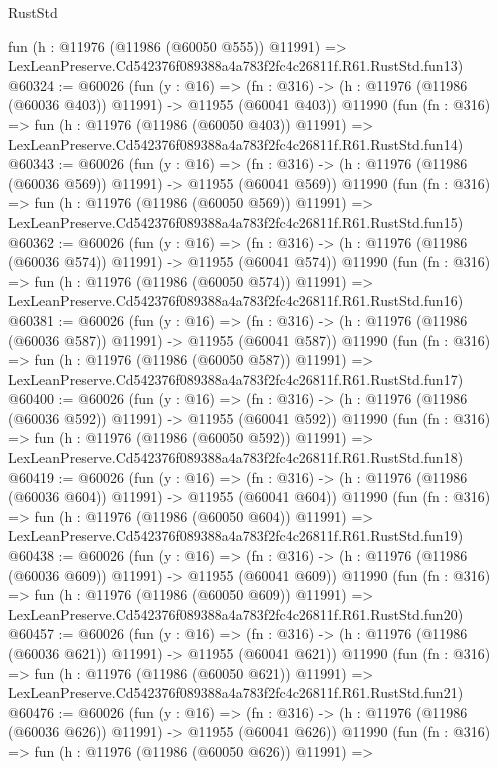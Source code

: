 \begin{lexlean}{RustStd}
\begin{coremodule}
    fun (h : @11976 (@11986 (@60050 @555)) @11991) =>
    LexLeanPreserve.Cd542376f089388a4a783f2fc4c26811f.R61.RustStd.fun13)
@60324 := @60026
    (fun (y : @16) =>
    (fn : @316) -> (h : @11976 (@11986 (@60036 @403)) @11991) -> @11955 (@60041 @403))
    @11990
    (fun (fn : @316) =>
    fun (h : @11976 (@11986 (@60050 @403)) @11991) =>
    LexLeanPreserve.Cd542376f089388a4a783f2fc4c26811f.R61.RustStd.fun14)
@60343 := @60026
    (fun (y : @16) =>
    (fn : @316) -> (h : @11976 (@11986 (@60036 @569)) @11991) -> @11955 (@60041 @569))
    @11990
    (fun (fn : @316) =>
    fun (h : @11976 (@11986 (@60050 @569)) @11991) =>
    LexLeanPreserve.Cd542376f089388a4a783f2fc4c26811f.R61.RustStd.fun15)
@60362 := @60026
    (fun (y : @16) =>
    (fn : @316) -> (h : @11976 (@11986 (@60036 @574)) @11991) -> @11955 (@60041 @574))
    @11990
    (fun (fn : @316) =>
    fun (h : @11976 (@11986 (@60050 @574)) @11991) =>
    LexLeanPreserve.Cd542376f089388a4a783f2fc4c26811f.R61.RustStd.fun16)
@60381 := @60026
    (fun (y : @16) =>
    (fn : @316) -> (h : @11976 (@11986 (@60036 @587)) @11991) -> @11955 (@60041 @587))
    @11990
    (fun (fn : @316) =>
    fun (h : @11976 (@11986 (@60050 @587)) @11991) =>
    LexLeanPreserve.Cd542376f089388a4a783f2fc4c26811f.R61.RustStd.fun17)
@60400 := @60026
    (fun (y : @16) =>
    (fn : @316) -> (h : @11976 (@11986 (@60036 @592)) @11991) -> @11955 (@60041 @592))
    @11990
    (fun (fn : @316) =>
    fun (h : @11976 (@11986 (@60050 @592)) @11991) =>
    LexLeanPreserve.Cd542376f089388a4a783f2fc4c26811f.R61.RustStd.fun18)
@60419 := @60026
    (fun (y : @16) =>
    (fn : @316) -> (h : @11976 (@11986 (@60036 @604)) @11991) -> @11955 (@60041 @604))
    @11990
    (fun (fn : @316) =>
    fun (h : @11976 (@11986 (@60050 @604)) @11991) =>
    LexLeanPreserve.Cd542376f089388a4a783f2fc4c26811f.R61.RustStd.fun19)
@60438 := @60026
    (fun (y : @16) =>
    (fn : @316) -> (h : @11976 (@11986 (@60036 @609)) @11991) -> @11955 (@60041 @609))
    @11990
    (fun (fn : @316) =>
    fun (h : @11976 (@11986 (@60050 @609)) @11991) =>
    LexLeanPreserve.Cd542376f089388a4a783f2fc4c26811f.R61.RustStd.fun20)
@60457 := @60026
    (fun (y : @16) =>
    (fn : @316) -> (h : @11976 (@11986 (@60036 @621)) @11991) -> @11955 (@60041 @621))
    @11990
    (fun (fn : @316) =>
    fun (h : @11976 (@11986 (@60050 @621)) @11991) =>
    LexLeanPreserve.Cd542376f089388a4a783f2fc4c26811f.R61.RustStd.fun21)
@60476 := @60026
    (fun (y : @16) =>
    (fn : @316) -> (h : @11976 (@11986 (@60036 @626)) @11991) -> @11955 (@60041 @626))
    @11990
    (fun (fn : @316) =>
    fun (h : @11976 (@11986 (@60050 @626)) @11991) =>

\end{coremodule}
\end{lexlean}
